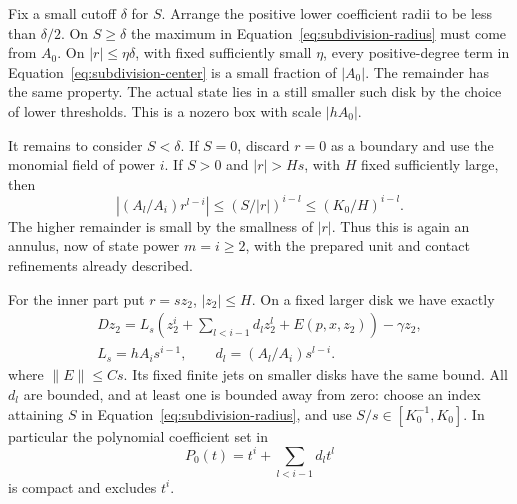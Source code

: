 Fix a small cutoff $\delta$ for $S$.  Arrange the positive lower
coefficient radii to be less than $\delta/2$.  On $S\ge\delta$ the
maximum in Equation~\eqref{eq:subdivision-radius} must come from $A_0$.
On $|r|\le\eta\delta$, with fixed sufficiently small $\eta$, every
positive-degree term in Equation~\eqref{eq:subdivision-center} is a
small fraction of $|A_0|$.  The remainder has the same property.  The
actual state lies in a still smaller such disk by the choice of lower
thresholds.  This is a nozero box with scale $|hA_0|$.

It remains to consider $S<\delta$.  If $S=0$, discard $r=0$ as a
boundary and use the monomial field of power $i$.  If $S>0$ and
$|r|>Hs$, with $H$ fixed sufficiently large, then
\[
 |(A_l/A_i)r^{l-i}|\le (S/|r|)^{i-l}
 \le (K_0/H)^{i-l}.
\]
The higher remainder is small by the smallness of $|r|$.  Thus this is
again an annulus, now of state power $m=i\ge2$, with the prepared unit
and contact refinements already described.

For the inner part put $r=sz_2$, $|z_2|\le H$.  On a fixed larger disk
we have exactly
\begin{equation}
\label{eq:subdivision-inner}
\begin{gathered}
 Dz_2=L_s\left(z_2^i+\sum_{l<i-1}d_lz_2^l+E(p,x,z_2)\right)
 -\gamma z_2,\\
 L_s=hA_is^{i-1},\qquad
 d_l=(A_l/A_i)s^{l-i}.
\end{gathered}
\end{equation}
where $\|E\|\le C s$.  Its fixed finite jets on smaller disks have the
same bound.  All $d_l$ are bounded, and at least one is bounded away
from zero: choose an index attaining $S$ in
Equation~\eqref{eq:subdivision-radius}, and use $S/s\in[K_0^{-1},K_0]$.
In particular the polynomial coefficient set in
\[
 P_0(t)=t^i+\sum_{l<i-1}d_lt^l
\]
is compact and excludes $t^i$.

